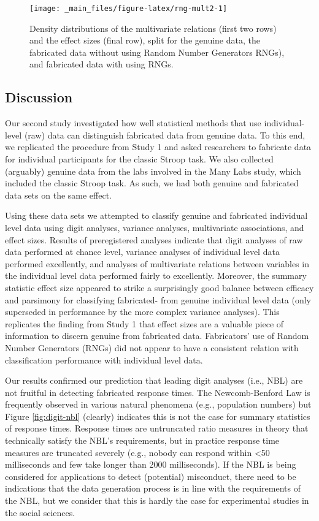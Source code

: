 \documentclass[a5paper]{book}
\begin{document}
\begin{figure}
\texttt{[image: \_main\_files/figure-latex/rng-mult2-1]} \caption{Density distributions of the multivariate relations (first two rows) and the effect sizes (final row), split for the genuine data, the fabricated data without using Random Number Generators RNGs), and fabricated data with using RNGs.}\label{fig:rng-mult2}
\end{figure}

\subsection{Discussion}\label{discussion-5}

Our second study investigated how well statistical methods that use
individual-level (raw) data can distinguish fabricated data from genuine
data. To this end, we replicated the procedure from Study 1 and asked
researchers to fabricate data for individual participants for the
classic Stroop task. We also collected (arguably) genuine data from the
labs involved in the Many Labs study, which included the classic Stroop
task. As such, we had both genuine and fabricated data sets on the same
effect.

Using these data sets we attempted to classify genuine and fabricated
individual level data using digit analyses, variance analyses,
multivariate associations, and effect sizes. Results of preregistered
analyses indicate that digit analyses of raw data performed at chance
level, variance analyses of individual level data performed excellently,
and analyses of multivariate relations between variables in the
individual level data performed fairly to excellently. Moreover, the
summary statistic effect size appeared to strike a surprisingly good
balance between efficacy and parsimony for classifying fabricated- from
genuine individual level data (only superseded in performance by the
more complex variance analyses). This replicates the finding from Study
1 that effect sizes are a valuable piece of information to discern
genuine from fabricated data. Fabricators' use of Random Number
Generators (RNGs) did not appear to have a consistent relation with
classification performance with individual level data.

Our results confirmed our prediction that leading digit analyses (i.e.,
NBL) are not fruitful in detecting fabricated response times. The
Newcomb-Benford Law is frequently observed in various natural phenomena
(e.g., population numbers) but Figure \ref{fig:digit-nbl} (clearly)
indicates this is not the case for summary statistics of response times.
Response times are untruncated ratio measures in theory that technically
satisfy the NBL's requirements, but in practice response time measures
are truncated severely (e.g., nobody can respond within \textless{}50
milliseconds and few take longer than 2000 milliseconds). If the NBL is
being considered for applications to detect (potential) misconduct,
there need to be indications that the data generation process is in line
with the requirements of the NBL, but we consider that this is hardly
the case for experimental studies in the social sciences.
\end{document}
